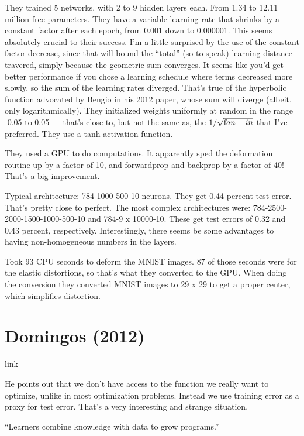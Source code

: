 \documentclass[12pt]{report}
\newcommand{\link}[2]{\href{#1}{#2}}
\begin{document}
They trained 5 networks, with 2 to 9 hidden layers each.  From 1.34 to
12.11 million free parameters.  They have a variable learning rate
that shrinks by a constant factor after each epoch, from 0.001 down to
0.000001.  This seems absolutely crucial to their success. I'm a
little surprised by the use of the constant factor decrease, since
that will bound the ``total'' (so to speak) learning distance
travered, simply because the geometric sum converges.  It seems like
you'd get better performance if you chose a learning schedule where
terms decreased more slowly, so the sum of the learning rates
diverged.  That's true of the hyperbolic function advocated by Bengio
in his 2012 paper, whose sum will diverge (albeit, only
logarithmically).  They initialized weights uniformly at random in the
range -0.05 to 0.05 --- that's close to, but not the same as, the
$1/\sqrt{\mbox fan-in}$ that I've preferred.  They use a tanh
activation function.

They used a GPU to do computations.  It apparently sped the
deformation routine up by a factor of 10, and forwardprop and backprop
by a factor of 40!  That's a big improvement.

Typical architecture: 784-1000-500-10 neurons.  They get 0.44 percent
test error.  That's pretty close to perfect.  The most complex
architectures were: 784-2500-2000-1500-1000-500-10 and 784-9 x
10000-10.  These get test errors of 0.32 and 0.43 percent,
respectively.  Interestingly, there seems be some advantages to having
non-homogeneous numbers in the layers.

Took 93 CPU seconds to deform the MNIST images.  87 of those seconds
were for the elastic distortions, so that's what they converted to the
GPU.  When doing the conversion they converted MNIST images to 29 x 29
to get a proper center, which simplifies distortion.

\section{Domingos (2012)} 

\link{http://scholar.google.ca/scholar?cluster=4404716649035182981\&hl=en\&as\_sdt=0,5}{link}

He points out that we don't have access to the function we really want
to optimize, unlike in most optimization problems.  Instead we use
training error as a proxy for test error.  That's a very interesting
and strange situation.

``Learners combine knowledge with data to grow programs.''
\end{document}
